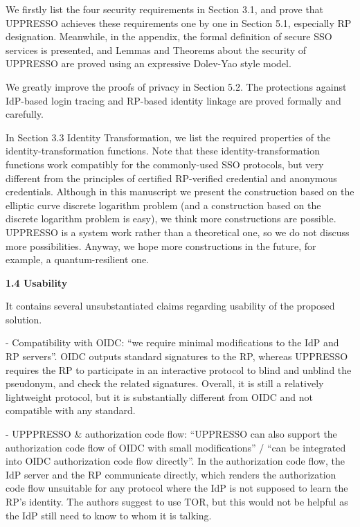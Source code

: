 \documentclass[letterpaper,onecolumn,10pt]{article}
\begin{document}
We firstly list the four security requirements in Section 3.1,
    and prove that UPPRESSO achieves these requirements one by one in Section 5.1, especially RP designation.
Meanwhile,
    in the appendix, the formal definition of secure SSO services is presented,
        and Lemmas and Theorems about the security of UPPRESSO are proved using an expressive Dolev-Yao style model.

We greatly improve the proofs of privacy in Section 5.2.
The protections against IdP-based login tracing and RP-based identity linkage are proved formally and carefully.

In Section 3.3 Identity Transformation,
    we list the required properties of the identity-transformation functions.
Note that these identity-transformation functions work compatibly for the commonly-used SSO protocols,
        but very different from the principles of certified RP-verified credential and anonymous credentials.
Although in this manuscript we present the construction based on the elliptic curve discrete logarithm problem
     (and a construction based on the discrete logarithm problem is  easy),
        we think more constructions are possible.
UPPRESSO is a system work rather than a theoretical one, so we do not discuss more possibilities.
Anyway, we hope more constructions in the future, for example, a quantum-resilient one.

\vspace{1mm}\noindent\textbf{1.4 Usability}

It contains several unsubstantiated claims regarding usability of the proposed solution.

- Compatibility with OIDC: ``we require minimal modifications to the IdP and RP servers''.
OIDC outputs standard signatures to the RP, whereas UPPRESSO requires the RP to participate in an interactive protocol to blind and unblind the pseudonym, and check the related signatures. Overall, it is still a relatively lightweight protocol, but it is substantially different from OIDC and not compatible with any standard.

- UPPPRESSO \& authorization code flow: ``UPPRESSO can also support the authorization code flow of OIDC with small modifications'' / ``can be integrated into OIDC authorization code flow directly''.
In the authorization code flow, the IdP server and the RP communicate directly, which renders the authorization code flow unsuitable for any protocol where the IdP is not supposed to learn the RP's identity. The authors suggest to use TOR, but this would not be helpful as the IdP still need to know to whom it is talking.
\end{document}
